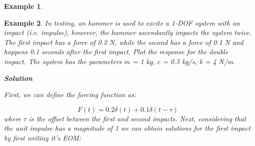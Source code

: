 \documentclass[12pt,letter]{article}
\newtheorem{ex}{Example}
\numberwithin{ex}{section} %
\newenvironment{example}{\begin{mdframed}[middlelinewidth=0.5mm]\begin{ex}\normalfont}{\end{ex}\end{mdframed}}
\begin{document}
\begin{example}

\end{example}
\begin{example}


In testing, an hammer is used to excite a 1-DOF system with an impact (i.e. impulse), however, the hammer ascendantly impacts the system twice. The first impact has a force of 0.2 N, while the second has a force of 0.1 N and happens 0.1 seconds after the first impact. Plot the response for the double impact. The system has the parameters $m$ = 1 kg, $c$ = 0.5 kg/s, k = 4 N/m. 

\textbf{Solution }

First, we can define the forcing function as:

\begin{equation}
	F(t) = 0.2 \delta (t) + 0.1 \delta(t-\tau)
\end{equation}
where $\tau$ is the offset between the first and second impacts. Next, considering that the unit impulse has a magnitude of 1 we can obtain solutions for the first impact by first writing it's EOM:


\end{example}
\end{document}
